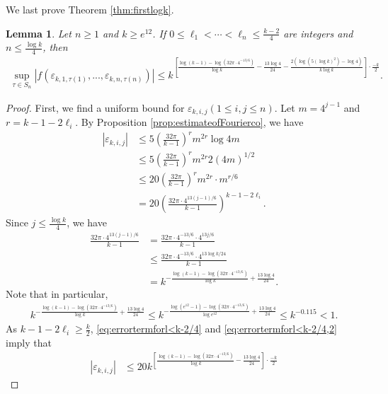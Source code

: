 \documentclass[11pt,letterpaper,reqno]{amsart}
\numberwithin{figure}{section}
\numberwithin{table}{section}
\theoremstyle{definition}
\theoremstyle{plain}
\newtheorem{lemma}[theorem]{Lemma}
\theoremstyle{definition}
\theoremstyle{definition}
\theoremstyle{remark}
\numberwithin{equation}{section}
\theoremstyle{remark}
\begin{document}
We last prove Theorem \ref{thm:firstlogk}. 
\begin{lemma}\label{prop:boundofsup}
Let $n\ge1$ and $k\geq e^{12}$. If $0\leq\ell_1<\cdots<\ell_n\leq\frac{k-2}{4}$ are integers and $n\leq\frac{\log k}{4}$, then
 \begin{align}
        \sup_{\tau\in S_n}|f(\varepsilon_{k,1,\tau(1)},...,\varepsilon_{k,n,\tau(n)})|\leq k^{\left[\frac{\log(k-1)-\log(32\pi\cdot4^{-13/6})}{\log k}-\frac{13\log4}{24}-\frac{2(\log(5(\log k)^2)-\log4)}{k\log k}\right]\cdot\frac{-k}{2}}.
    \end{align}
\end{lemma}
\begin{proof}
First, we find a uniform bound for $\varepsilon_{k,i,j} (1\leq i,j\leq n)$.
Let $m=4^{j-1}$ and $r=k-1-2\ell_i$. By Proposition \ref{prop:estimateofFourierco}, we have
\begin{align}
   |\varepsilon_{k,i,j}|&\leq5\left(\frac{32\pi}{k-1}\right)^rm^{2r}\log4m\\&\leq5\left(\frac{32\pi}{k-1}\right)^rm^{2r}2(4m)^{1/2}\\&\leq20\left(\frac{32\pi}{k-1}\right)^rm^{2r}\cdot m^{r/6}\\&=20\left(\frac{32\pi\cdot4^{13(j-1)/6}}{k-1}\right)^{k-1-2\ell_i}.\label{eq:errortermforl<k-2/4}
\end{align}
Since $j\leq\frac{\log k}{4}$, we have
   \begin{align}
       \frac{32\pi\cdot4^{13(j-1)/6}}{k-1}&=\frac{32\pi\cdot4^{-13/6}\cdot4^{13j/6}}{k-1}\\&\leq\frac{32\pi\cdot4^{-13/6}\cdot4^{13\log k/24}}{k-1}\\&=
       k^{-\frac{\log(k-1)-\log(32\pi\cdot4^{-13/6})}{\log k}+\frac{13\log4}{24}}.\label{eq:errortermforl<k-2/4,2}
   \end{align}
Note that in particular,
\begin{align}
    k^{-\frac{\log(k-1)-\log(32\pi\cdot4^{-13/6})}{\log k}+\frac{13\log4}{24}}\leq k^{-\frac{\log(e^{12}-1)-\log(32\pi\cdot4^{-13/6})}{\log e^{12}}+\frac{13\log 4}{24}}\leq k^{-0.115}<1.\label{eq:middlestepforuseoflem}
\end{align}
As $k-1-2\ell_i\geq \frac{k}{2}$, \eqref{eq:errortermforl<k-2/4} and \eqref{eq:errortermforl<k-2/4,2} imply that 
\begin{align}
|\varepsilon_{k,i,j}|&\leq 20k^{\left[\frac{\log(k-1)-\log(32\pi\cdot4^{-13/6})}{\log k}-\frac{13\log4}{24}\right]\cdot\frac{-k}{2}}\label{eq:boundofnewerror}
\end{align}

\end{proof}
\end{document}
